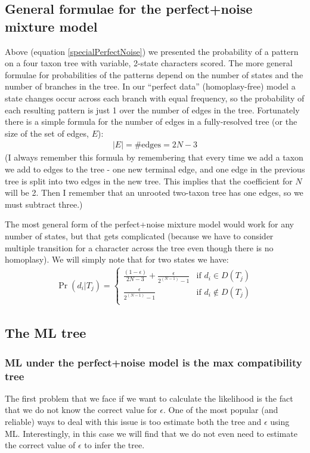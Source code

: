 \documentclass[11pt]{article}
\begin{document}
\subsection*{General formulae for the perfect+noise mixture model}
Above (equation \ref{specialPerfectNoise}) we presented the probability of a pattern on a four taxon 
tree with variable, 2-state characters scored.
The more general formulae for probabilities of the patterns depend on the number of states and the
number of branches in the tree.
In our ``perfect data'' (homoplasy-free) model a state changes occur across each branch with
equal frequency, so the probability of each resulting pattern is just 1 over the number of edges in the
tree.
Fortunately there is a simple formula for the number of edges in a fully-resolved tree (or the size of the
set of edges, $E$):
\begin{eqnarray}
	|E| = \mbox{\# edges} = 2N-3
\end{eqnarray}
(I always remember this formula by remembering that every time we add a taxon we add to edges to the tree - one
new terminal edge, and one edge in the previous tree is split into two edges in the new tree.
This implies that the coefficient for $N$ will be 2.  
Then I remember that an unrooted two-taxon tree has one edges, so we must subtract three.)

The most general form of the perfect+noise mixture model would work for any number of states, but that
gets complicated (because we have to consider multiple transition for a character across the tree
even though there is no homoplasy).
We will simply note that for two states we have:
\begin{eqnarray}
	\Pr(d_i|T_j) = \left\{ \begin{array}{cc}
\frac{(1-\epsilon)}{2N-3} + \frac{\epsilon}{2^{(N-1)} - 1} &  \mbox{if } d_i \in D(T_j)   \\ 
	\frac{\epsilon}{2^{(N-1)} - 1} &  \mbox{if } d_i \notin D(T_j)   \\
\end{array} \right.
\end{eqnarray}

\subsection*{The ML tree}
\subsubsection*{ML under the perfect+noise model is the max compatibility tree}
The first problem that we face if we want to calculate the likelihood is the fact that we do
not know the correct value for $\epsilon$.
One of the most popular (and reliable) ways to deal with this issue is too estimate
both the tree and $\epsilon$ using ML.
Interestingly, in this case we will find that we do not even need to estimate the correct
value of $\epsilon$ to infer the tree.
\end{document}
